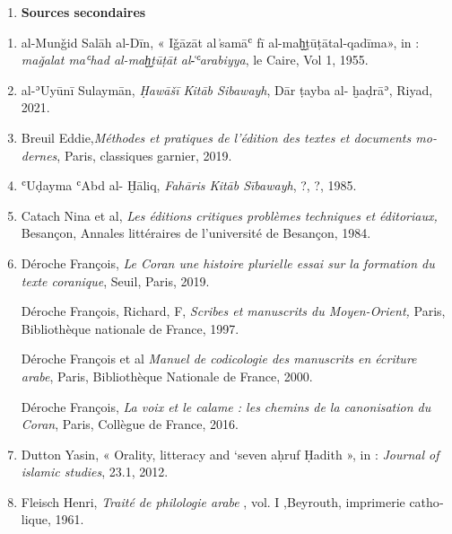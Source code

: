 \documentclass[a4paper,12pt]{report}
\begin{document}
\begin{french}
\begin{enumerate} [III]
    
    
    
    

    \newpage

     \begin{enumerate} [IV]
     
    
    \item \textbf{ Sources secondaires}

    \end{enumerate}
    
    \begin{enumerate} 

    
     \item al-Munǧid Salāh al-Dīn, « Iǧāzāt al ͗samāʿ   fī al-maḫ̬ṭūṭātal-qadīma», in : \textit{maǧalat maʿhad al-maḫ̬ṭūṭāt al-͑ʿarabiyya}, le Caire, Vol 1,  1955.

\item  al-ʾUyūnī Sulaymān,\textit{ Ḥawāšī Kitāb Sibawayh}, Dār ṭayba al- ḫaḍrāʾ, Riyad, 2021.
  \item Breuil Eddie,\textit{Méthodes et pratiques de l'édition  des textes et documents modernes}, Paris, classiques garnier, 2019.
  \item ʿUḍayma ʿAbd al- Ḫāliq, \textit {Fahāris  Kitāb  Sībawayh}, ?, ?, 1985.
        
\item  Catach Nina et al, \textit{Les éditions critiques problèmes techniques et éditoriaux,} Besançon, Annales littéraires de l'université de Besançon, 1984.  
        



       \item Déroche François, \textit{Le Coran une histoire plurielle essai sur la formation du texte coranique}, Seuil, Paris, 2019.
       
\textemdash \textemdash  Déroche François, Richard, F, \textit{Scribes et manuscrits du Moyen-Orient,} Paris, Bibliothèque nationale de France, 1997.




\textemdash \textemdash     Déroche  François et al  \textit{ Manuel de codicologie des manuscrits en écriture arabe}, Paris, Bibliothèque Nationale de France, 2000.

\textemdash \textemdash Déroche François, \textit{ La voix et le calame : les chemins de la canonisation du Coran}, Paris, Collègue de France, 2016.

\item Dutton Yasin, « Orality, litteracy and ‘seven aḥruf Ḥadith », in : \textit{Journal of islamic studies}, 23.1, 2012.
\item  Fleisch Henri, \textit{Traité de philologie arabe }, vol. I ,Beyrouth, imprimerie catholique, 1961.


\end{enumerate}
\end{enumerate}
\end{french}
\end{document}
